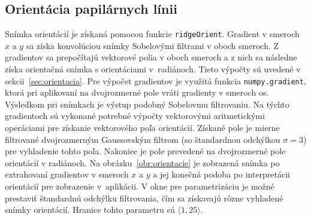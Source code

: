   \subsection{Orientácia papilárnych línii}
  Snímka orientácií je získaná pomocou funkcie \texttt{ridgeOrient}. Gradient v smeroch $x$ a $y$ sa získa konvolúciou snímky Sobelovými filtrami v oboch smeroch.
  Z gradientov sa prepočítajú vektorové polia v oboch smeroch a z nich sa následne získa orientačná snímka s orientáciami v~radiánoch. Tieto výpočty sú
  uvedené v sekcii~{\ref{sec:orientacia}}. Pre výpočet gradientov je využitá funkcia \texttt{numpy.gradient}, ktorá pri aplikovaní na dvojrozmerné pole
  vráti gradienty v smeroch os. Výsledkom pri snímkach je výstup podobný Sobelovmu filtrovaniu. Na týchto gradientoch sú vykonané potrebné výpočty vektorovými
  aritmetickými operáciami pre získanie vektorového poľa orientácií. Získané pole je mierne filtrované dvojrozmerným Gaussovským filtrom (so štandardnou
  odchýlkou $\sigma = 3$) pre vyhladenie tohto poľa. Nakoniec je pole prevedené na dvojrozmerné pole orientácií v radiánoch.
  Na obrázku~{\ref{obr:orientacie}} je zobrazená snímka po extrahovaní gradientov v smeroch $x$ a $y$ a jej konečná podoba po interpretácii orientácií pre
  zobrazenie v~aplikácii. V okne pre parametrizáciu je možné prestaviť štandardnú odchýlku filtrovania, čím sa získavajú rôzne vyhladené snímky orientácií.
  Hranice tohto parametru sú $\langle{}1,25\rangle{}$.

